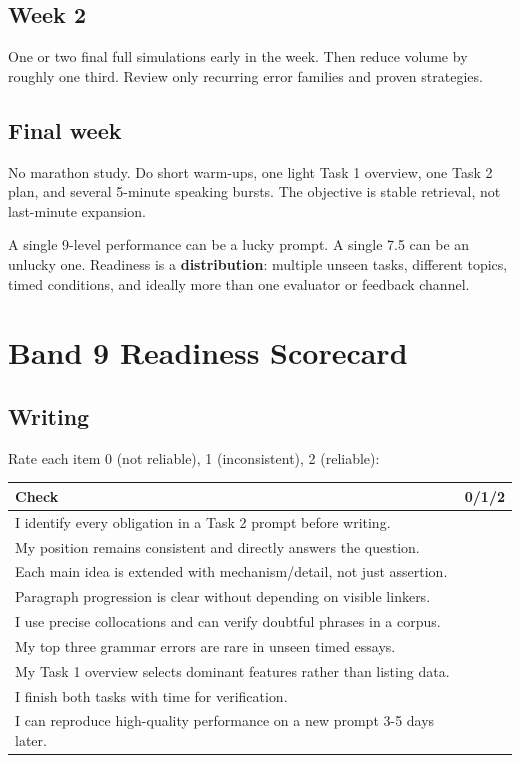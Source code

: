 \documentclass[11pt,a4paper]{article}
\begin{document}
\subsection{Week 2}
One or two final full simulations early in the week. Then reduce volume by roughly one third. Review only recurring error families and proven strategies.

\subsection{Final week}
No marathon study. Do short warm-ups, one light Task 1 overview, one Task 2 plan, and several 5-minute speaking bursts. The objective is stable retrieval, not last-minute expansion.

\begin{warningbox}
A single 9-level performance can be a lucky prompt. A single 7.5 can be an unlucky one. Readiness is a \textbf{distribution}: multiple unseen tasks, different topics, timed conditions, and ideally more than one evaluator or feedback channel.
\end{warningbox}

\section{Band 9 Readiness Scorecard}

\subsection{Writing}
Rate each item 0 (not reliable), 1 (inconsistent), 2 (reliable):
\begin{longtable}{p{}p{}}
\toprule
Check & 0/1/2 \\
\midrule
I identify every obligation in a Task 2 prompt before writing. & \\
My position remains consistent and directly answers the question. & \\
Each main idea is extended with mechanism/detail, not just assertion. & \\
Paragraph progression is clear without depending on visible linkers. & \\
I use precise collocations and can verify doubtful phrases in a corpus. & \\
My top three grammar errors are rare in unseen timed essays. & \\
My Task 1 overview selects dominant features rather than listing data. & \\
I finish both tasks with time for verification. & \\
I can reproduce high-quality performance on a new prompt 3-5 days later. & \\
\bottomrule
\end{longtable}
\end{document}

